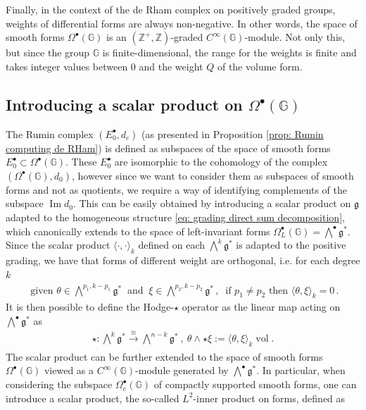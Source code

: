 \documentclass[dvipsnames]{amsart}
\theoremstyle{definition}
\theoremstyle{definition}
\numberwithin{equation}{section}
\newcommand{\Z}{\mathbb{Z}}
\newcommand{\G}{\mathbb{G}}
\begin{document}
Finally, in the context of the de Rham complex on positively graded groups, weights of differential forms are always non-negative. In other words, the space of smooth forms $\Omega^\bullet(\G)$ is an $(\Z^+,\Z)$-graded $C^\infty(\G)$-module. Not only this, but since the group $\G$ is finite-dimensional, the range for the weights is finite and takes integer values between 0 and the weight $Q$ of the volume form.
\subsection{Introducing a scalar product on $\Omega^\bullet(\G)$}\label{subsection: introducing a scalar product}
The Rumin complex $(E_0^\bullet,d_c)$ (as presented in Proposition \ref{prop: Rumin computing de RHam}) is defined as subspaces of the space of smooth forms $E_0^\bullet\subset\Omega^\bullet(\G)$. These $E_0^\bullet$ are isomorphic to the cohomology of the complex $(\Omega^\bullet(\G),d_0)$, however since we want to consider them as subspaces of smooth forms and not as quotients, we require a way of identifying complements of the subspace $\operatorname{Im}d_0$. This can be easily obtained by introducing a scalar product on $\mathfrak{g}$ adapted to the homogeneous structure \eqref{eq: grading direct sum decomposition}, which canonically extends to the space of left-invariant forms $\Omega^\bullet_L(\G)=\bigwedge^\bullet\mathfrak{g}^\ast$. Since the scalar product $\langle\cdot,\cdot\rangle_k$ defined on each $\bigwedge^k\mathfrak{g}^\ast$ is adapted to the positive grading, we have that forms of different weight are orthogonal, i.e. for each degree $k$ 
\begin{align}\label{eq: left diff weight implies orthogonal}
    \text{ given }\theta\in\bigwedge\nolimits^{p_1,k-p_1}\mathfrak{g}^\ast\ \text{ and }\ \xi\in\bigwedge\nolimits^{p_2,k-p_2}\mathfrak{g}^\ast\,,\ \text{ if }p_1\neq p_2\text{ then }\langle\theta,\xi\rangle_k=0\,.
\end{align}
It is then possible to define the Hodge-$\star$ operator as the linear map acting on $\bigwedge^\bullet\mathfrak{g}^\ast$ as
\begin{align*}
    \star\colon\bigwedge\nolimits^k\mathfrak{g}^\ast\xrightarrow[]{\cong}\bigwedge\nolimits^{n-k}\mathfrak{g}^\ast\ ,\ \theta\wedge\star\xi:=\langle\theta,\xi\rangle_k\operatorname{vol}.
\end{align*}
The scalar product can be further extended to the space of smooth forms $\Omega^\bullet(\G)$ viewed as a $C^\infty(\G)$-module generated by $\bigwedge^\bullet\mathfrak{g}^\ast$.   In particular, when considering the subspace $\Omega^\bullet_c(\G)$ of compactly supported smooth forms, one can introduce a scalar product, the so-called $L^2$-inner product on forms, defined as
\end{document}
